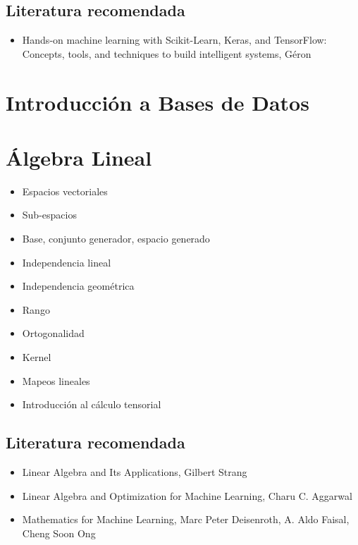 \documentclass{article}
\begin{document}
        \subsection{Literatura recomendada}

            \begin{itemize}
                \item Hands-on machine learning with Scikit-Learn, Keras, and TensorFlow: Concepts, tools, and techniques to build intelligent systems, Géron \cite{geron2019hands}
            \end{itemize}

    \section{Introducción a Bases de Datos}

    \section{Álgebra Lineal}

        \begin{itemize}
            \item Espacios vectoriales
            \item Sub-espacios
            \item Base, conjunto generador, espacio generado
            \item Independencia lineal
            \item Independencia geométrica
            \item Rango
            \item Ortogonalidad
            \item Kernel
            \item Mapeos lineales
            \item Introducción al cálculo tensorial
        \end{itemize}

        \subsection{Literatura recomendada}

            \begin{itemize}
                \item Linear Algebra and Its Applications, Gilbert Strang \cite{strang2006linear}
                \item Linear Algebra and Optimization for Machine Learning, Charu C. Aggarwal \cite{aggarwal2020linear}
                \item Mathematics for Machine Learning, Marc Peter Deisenroth, A. Aldo Faisal, Cheng Soon Ong \cite{deisenroth2020mathematics}
            \end{itemize}
\end{document}
